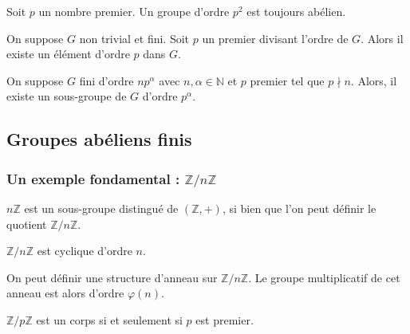   \begin{corollary}
    Soit $p$ un nombre premier. Un groupe d'ordre $p^2$ est toujours abélien.
  \end{corollary}

  \begin{application}
    On suppose $G$ non trivial et fini. Soit $p$ un premier divisant l'ordre de $G$. Alors il existe un élément d'ordre $p$ dans $G$.
  \end{application}
  
  
  \begin{application}
    On suppose $G$ fini d'ordre $n p^\alpha$ avec $n, \alpha \in \mathbb{N}$ et $p$ premier tel que $p \nmid n$. Alors, il existe un sous-groupe de $G$ d’ordre $p^\alpha$.
  \end{application}

  \subsection{Groupes abéliens finis}

  \subsubsection{Un exemple fondamental : \texorpdfstring{$\mathbb{Z}/n\mathbb{Z}$}{Z/nZ}}


  \begin{proposition}
    $n\mathbb{Z}$ est un sous-groupe distingué de $(\mathbb{Z}, +)$, si bien que l'on peut définir le quotient $\mathbb{Z}/n\mathbb{Z}$.
  \end{proposition}

  \begin{proposition}
    $\mathbb{Z}/n\mathbb{Z}$ est cyclique d'ordre $n$.
  \end{proposition}

  \begin{proposition}
    On peut définir une structure d'anneau sur $\mathbb{Z}/n\mathbb{Z}$. Le groupe multiplicatif de cet anneau est alors d'ordre $\varphi(n)$.
  \end{proposition}

  \begin{corollary}
    $\mathbb{Z}/p\mathbb{Z}$ est un corps si et seulement si $p$ est premier.
  \end{corollary}

